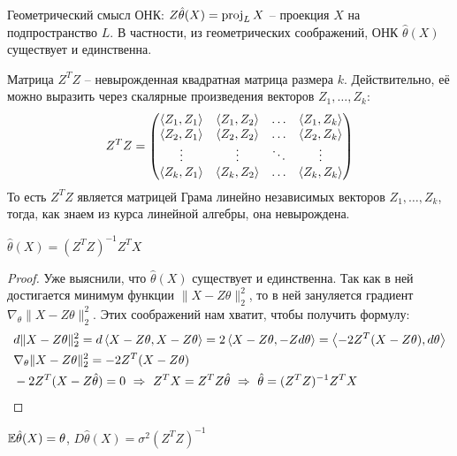 \begin{note}
    Геометрический смысл ОНК: $Z \hat{\theta}(X) = \operatorname{proj}_L X$ -- проекция $X$ на подпространство $L$. В частности, из геометрических соображений, ОНК $\hat{\theta}(X)$ существует и единственна.
\end{note}

\begin{note}
    Матрица $Z^T Z$ -- невырожденная квадратная матрица размера $k$. Действительно, её можно выразить через скалярные произведения векторов $Z_1, \dots, Z_k$:
    \[
        Z^T Z = \begin{pmatrix}
            \left\langle Z_1, Z_1\right\rangle & \left\langle Z_1, Z_2\right\rangle & \hdots & \left\langle Z_1, Z_k\right\rangle \\
            \left\langle Z_2, Z_1\right\rangle & \left\langle Z_2, Z_2\right\rangle & \hdots & \left\langle Z_2, Z_k\right\rangle \\
            \vdots & \vdots & \ddots & \vdots \\
            \left\langle Z_k, Z_1\right\rangle & \left\langle Z_k, Z_2\right\rangle & \hdots & \left\langle Z_k, Z_k\right\rangle
        \end{pmatrix}
    \]
    То есть $Z^T Z$ является матрицей Грама линейно независимых векторов $Z_1, \dots, Z_k$, тогда, как знаем из курса линейной алгебры, она невырождена.
\end{note}

\begin{proposition}
    $\hat{\theta}(X) = (Z^T Z)^{-1} Z^T X$
\end{proposition}

\begin{proof}
    Уже выяснили, что $\hat{\theta}(X)$ существует и единственна. Так как в ней достигается минимум функции $\|X - Z\theta\|^2_2$, то в ней зануляется градиент $\nabla_\theta \|X - Z\theta\|^2_2$. Этих соображений нам хватит, чтобы получить формулу:
    \begin{align*}
        & d \|X - Z\theta\|^2_2 = d \left\langle X - Z\theta, X - Z\theta\right\rangle = 2 \left\langle X - Z\theta, -Z d\theta\right\rangle = \left\langle-2 Z^T (X - Z \theta), d\theta\right\rangle
        \\
        & \nabla_\theta \|X - Z\theta\|^2_2 = -2 Z^T (X - Z \theta)
        \\
        & -2 Z^T (X - Z \hat{\theta}) = 0 \ \Rightarrow \ Z^T X = Z^T Z \hat{\theta} \ \Rightarrow \ \hat{\theta} = (Z^T Z)^{-1} Z^T X
    \end{align*}
\end{proof}

\begin{proposition}
    $\mathbb{E}\hat{\theta}(X) = \theta$, $D\hat{\theta}(X) = \sigma^2 (Z^T Z)^{-1}$
\end{proposition}

